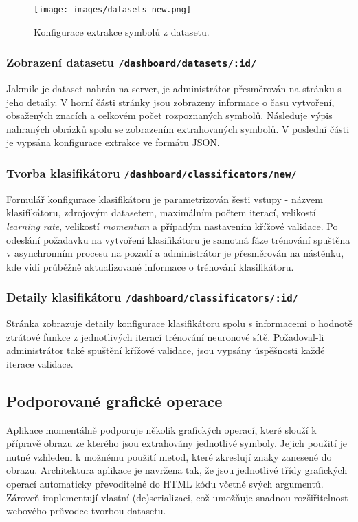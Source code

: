 \documentclass[
  field=ainfp,
  master=true,
  biblatex,
  sourcecodes=false,
  theorems=false,
  glossaries,
  index
]{kidiplom}
\begin{document}
\begin{figure}[h]
  \centering
  \texttt{[image: images/datasets\_new.png]}
  \caption{Konfigurace extrakce symbolů z datasetu.}
  \label{fig:dataset_new}
\end{figure}

\subsubsection*{Zobrazení datasetu \texttt{/dashboard/datasets/:id/}}
Jakmile je dataset nahrán na server, je administrátor přesměrován na stránku s jeho detaily. V horní části stránky jsou zobrazeny informace o času vytvoření, obsažených znacích a celkovém počet rozpoznaných symbolů. Následuje výpis nahraných obrázků spolu se zobrazením extrahovaných symbolů. V poslední části je vypsána konfigurace extrakce ve formátu JSON. 

\subsubsection*{Tvorba klasifikátoru \texttt{/dashboard/classificators/new/}}
Formulář konfigurace klasifikátoru je parametrizován šesti vstupy - názvem klasifikátoru, zdrojovým datasetem, maximálním počtem iterací, velikostí \textit{learning rate}, velikostí \textit{momentum} a případým nastavením křížové validace. Po odeslání požadavku na vytvoření klasifikátoru je samotná fáze trénování spuštěna v asynchronním procesu na pozadí a administrátor je přesměrován na nástěnku, kde vidí průběžně aktualizované informace o trénování klasifikátoru.

\subsubsection*{Detaily klasifikátoru \texttt{/dashboard/classificators/:id/}}
Stránka zobrazuje detaily konfigurace klasifikátoru spolu s informacemi o hodnotě ztrátové funkce z jednotlivých iterací trénování neuronové sítě. Požadoval-li administrátor také spuštění křížové validace, jsou vypsány úspěšnosti každé iterace validace.


\subsection{Podporované grafické operace}
Aplikace momentálně podporuje několik grafických operací, které slouží k pří\-pravě obrazu ze kterého jsou extrahovány jednotlivé symboly. Jejich použití je nutné vzhledem k možnému použití metod, které zkreslují znaky zanesené do obrazu. Architektura aplikace je navržena tak, že jsou jednotlivé třídy grafických operací automaticky převoditelné do HTML kódu včetně svých argumentů. Zároveň implementují vlastní (de)se\-riali\-zaci, což umožňuje snadnou rozšiřitelnost webového průvodce tvorbou data\-setu.
\end{document}
